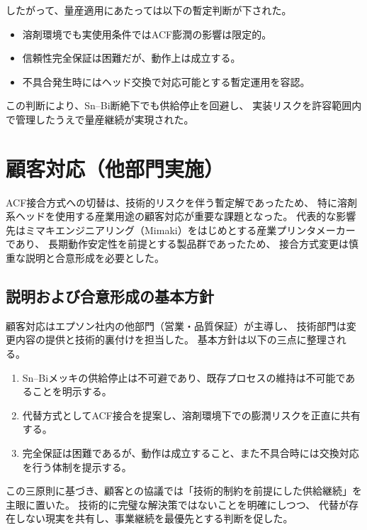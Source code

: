 \documentclass[conference]{IEEEtran}
\begin{document}
したがって、量産適用にあたっては以下の暫定判断が下された。

\begin{itemize}
  \item 溶剤環境でも実使用条件ではACF膨潤の影響は限定的。  
  \item 信頼性完全保証は困難だが、動作上は成立する。  
  \item 不具合発生時にはヘッド交換で対応可能とする暫定運用を容認。
\end{itemize}

この判断により、Sn–Bi断絶下でも供給停止を回避し、  
実装リスクを許容範囲内で管理したうえで量産継続が実現された。

\section{顧客対応（他部門実施）}

ACF接合方式への切替は、技術的リスクを伴う暫定解であったため、  
特に溶剤系ヘッドを使用する産業用途の顧客対応が重要な課題となった。  
代表的な影響先はミマキエンジニアリング（Mimaki）をはじめとする産業プリンタメーカーであり、  
長期動作安定性を前提とする製品群であったため、  
接合方式変更は慎重な説明と合意形成を必要とした。

\subsection{説明および合意形成の基本方針}
顧客対応はエプソン社内の他部門（営業・品質保証）が主導し、  
技術部門は変更内容の提供と技術的裏付けを担当した。  
基本方針は以下の三点に整理される。

\begin{enumerate}
  \item Sn–Biメッキの供給停止は不可避であり、既存プロセスの維持は不可能であることを明示する。  
  \item 代替方式としてACF接合を提案し、溶剤環境下での膨潤リスクを正直に共有する。  
  \item 完全保証は困難であるが、動作は成立すること、また不具合時には交換対応を行う体制を提示する。  
\end{enumerate}

この三原則に基づき、顧客との協議では「技術的制約を前提にした供給継続」を主眼に置いた。  
技術的に完璧な解決策ではないことを明確にしつつ、  
代替が存在しない現実を共有し、事業継続を最優先とする判断を促した。
\end{document}
